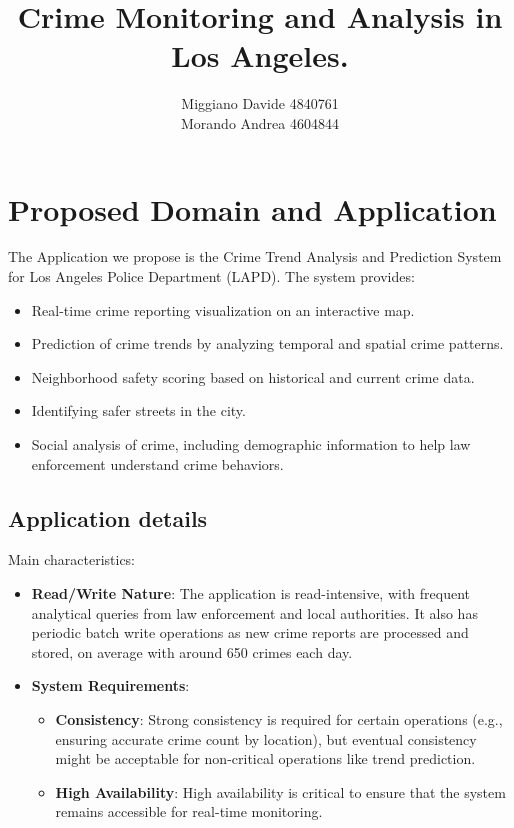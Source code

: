 \author{Miggiano Davide 4840761\\ Morando Andrea 4604844}
\date{}



\title{Crime Monitoring and Analysis in Los Angeles.}
\maketitle

\section{Proposed Domain and Application}
The Application we propose is the Crime Trend Analysis and Prediction System for Los Angeles Police Department (LAPD). The system provides:
\begin{itemize}
    \item Real-time crime reporting visualization on an interactive map.
    \item Prediction of crime trends by analyzing temporal and spatial crime patterns.
    \item Neighborhood safety scoring based on historical and current crime data.
    \item Identifying safer streets in the city.
    \item Social analysis of crime, including demographic information to help law enforcement understand crime behaviors.
\end{itemize}

\subsection{Application details}
Main characteristics:
\begin{itemize}
    \item \textbf{Read/Write Nature}: The application is read-intensive, with frequent analytical queries from law enforcement and local authorities. It also has periodic batch write operations as new crime reports are processed and stored, on average with around 650 crimes each day.
    \item \textbf{System Requirements}: 
    \begin{itemize}
        \item \textbf{Consistency}: Strong consistency is required for certain operations (e.g., ensuring accurate crime count by location), but eventual consistency might be acceptable for non-critical operations like trend prediction.
        \item \textbf{High Availability}: High availability is critical to ensure that the system remains accessible for real-time monitoring.
    \end{itemize}
\end{itemize}


